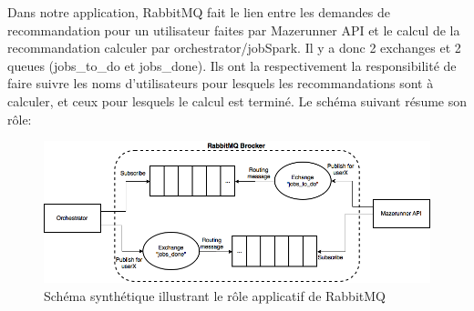 Dans notre application, RabbitMQ fait le lien entre les demandes de recommandation pour un utilisateur faites par Mazerunner API et le calcul de la recommandation calculer par orchestrator/jobSpark. Il y a donc 2 exchanges et 2 queues (jobs\_to\_do et jobs\_done). Ils ont la respectivement la responsibilité de faire suivre les noms d'utilisateurs pour lesquels les recommandations sont à calculer, et ceux pour lesquels le calcul est terminé. Le schéma suivant résume son rôle:
\ \\
\begin{figure}[h]
    \centering
    \includegraphics[scale=0.4]{pics/rabbitmq_role.png}
    \caption{Schéma synthétique illustrant le rôle applicatif de RabbitMQ}
\end{figure}
\FloatBarrier
